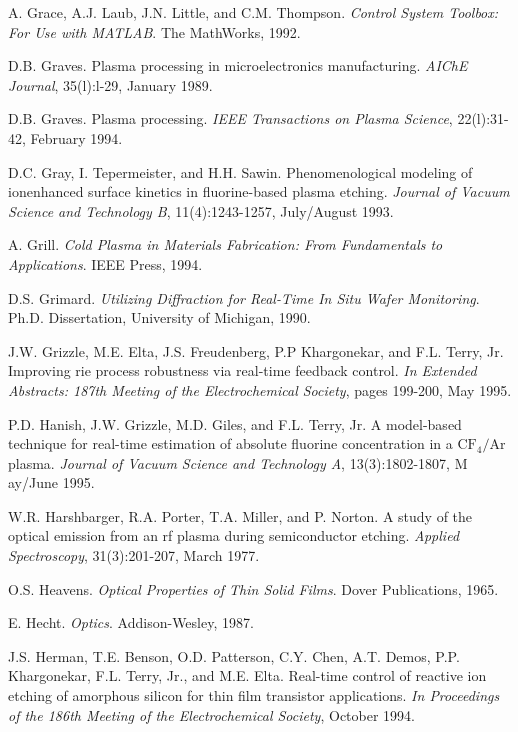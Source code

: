 \begin{thebibliography}{100}
	  A. Grace, A.J. Laub, J.N. Little, and C.M. Thompson. \emph{Control System Toolbox: For Use with MATLAB}. The MathWorks, 1992.

	
	 D.B. Graves. Plasma processing in microelectronics manufacturing. \emph{AIChE Journal}, 35(l):l-29, January 1989.
	
	 D.B. Graves. Plasma processing. \emph{IEEE Transactions on Plasma Science}, 22(l):31-42, February 1994.
	
	 D.C. Gray, I. Tepermeister, and H.H. Sawin. Phenomenological modeling of ionenhanced surface kinetics in fluorine-based plasma etching. \emph{Journal of Vacuum Science and Technology B}, 11(4):1243-1257, July/August 1993.
	
	 A. Grill. \emph{Cold Plasma in Materials Fabrication: From Fundamentals to Applications}. IEEE Press, 1994.
	
	 D.S. Grimard. \emph{Utilizing Diffraction for Real-Time In Situ Wafer Monitoring}. Ph.D. Dissertation, University of Michigan, 1990.
	
	 J.W. Grizzle, M.E. Elta, J.S. Freudenberg, P.P Khargonekar, and F.L. Terry, Jr. Improving rie process robustness via real-time feedback control. \emph{In Extended Abstracts: 187th Meeting of the Electrochemical Society}, pages 199-200, May 1995.

	
	 P.D. Hanish, J.W. Grizzle, M.D. Giles, and F.L. Terry, Jr. A model-based technique for real-time estimation of absolute fluorine concentration in a $\text{CF}_{4}/\text{Ar}$ plasma. \emph{Journal of Vacuum Science and Technology A}, 13(3):1802-1807, M ay/June 1995.
	
	 W.R. Harshbarger, R.A. Porter, T.A. Miller, and P. Norton. A study of the optical emission from an rf plasma during semiconductor etching. \emph{Applied Spectroscopy}, 31(3):201-207, March 1977.
	
	 O.S. Heavens. \emph{Optical Properties of Thin Solid Films}. Dover Publications, 1965.
	
	 E. Hecht. \emph{Optics}. Addison-Wesley, 1987.
	
	 J.S. Herman, T.E. Benson, O.D. Patterson, C.Y. Chen, A.T. Demos, P.P. Khargonekar, F.L. Terry, Jr., and M.E. Elta. Real-time control of reactive ion etching of amorphous silicon for thin film transistor applications. \emph{In Proceedings of the 186th Meeting of the Electrochemical Society}, October 1994.


\end{thebibliography}
